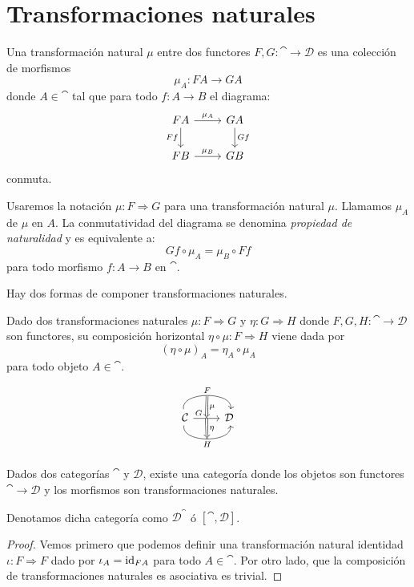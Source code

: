 \section{Transformaciones naturales}
\begin{definition}
Una transformación natural $\mu$ entre dos functores $F, G \colon \cat \to \mathcal{D}$ es una colección de morfismos
\[ \mu_A \colon F A \to G A \]
donde $A \in \cat$ tal que para todo $f \colon A \to B$ el diagrama:
\[
\begin{tikzcd}
F A \arrow[r,"\mu_A"] \arrow[d,"F f" left] & G A \arrow[d,"G f"]\\
F B \arrow[r,"\mu_B"] & G B
\end{tikzcd}
\]
conmuta.
\end{definition}

Usaremos la notación $\mu \colon F \Rightarrow G$ para una transformación natural $\mu$.
Llamamos $\mu_A$  de $\mu$ en $A$.
La conmutatividad del diagrama se denomina \emph{propiedad de naturalidad} y es equivalente a:
\[ G f \circ \mu_A = \mu_B \circ F f \]
para todo morfismo $f \colon A \to B$ en $\cat$.

Hay dos formas de componer transformaciones naturales.
\begin{definition}
Dado dos transformaciones naturales $\mu \colon F \Rightarrow G$ y $\eta \colon G \Rightarrow H$ donde $F,G,H \colon \cat \to \mathcal{D}$ son functores, su composición horizontal $\eta \circ \mu \colon F \Rightarrow H$ viene dada por
\[ (\eta \circ \mu)_A = \eta_A \circ \mu_A \]
para todo objeto $A \in \cat$.
\end{definition}
\[ \begin{tikzcd}{\cat} \arrow[r,"F", bend left=100, ""{name=U}] \arrow[r,"G", pos=0.2,""{name=M, pos=0.5,below},""{name=M', pos=0.5,above}] \arrow[r,"H" below, bend right=100, ""{name=D, below}] & \mathcal{D}\\
\arrow[Rightarrow, from=U, to=M, "\mu"] \arrow[Rightarrow, from=M', to=D, "\eta"]\end{tikzcd}\]

\begin{lemma}\label{functor-categoria}
Dados dos categorías $\cat$ y $\mathcal{D}$, existe una categoría donde los objetos son functores $\cat \to \mathcal{D}$ y los morfismos son transformaciones naturales.

Denotamos dicha categoría como $\mathcal{D}^\cat$ ó $[\cat,\mathcal{D}]$.
\end{lemma}
\begin{proof}
Vemos primero que podemos definir una transformación natural identidad $\iota \colon F \Rightarrow F$ dado por $\iota_A = \operatorname{id}_{F A}$ para todo $A \in \cat$.
Por otro lado, que la composición de transformaciones naturales es asociativa es trivial.
\end{proof}

